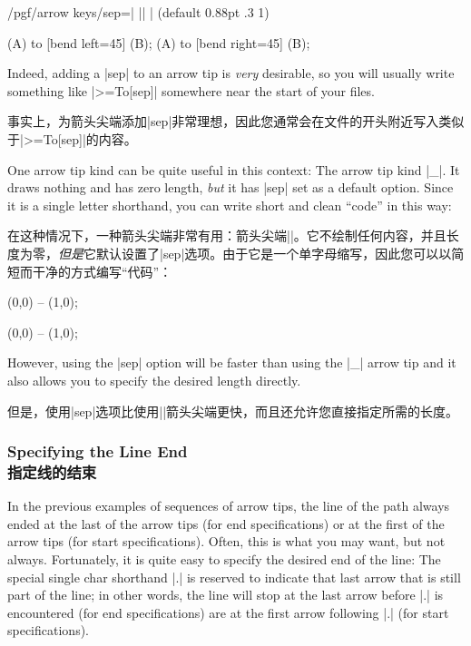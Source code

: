 \begin{key}{/pgf/arrow keys/sep=| || | (default 0.88pt .3 1)%
}
\begin{codeexample}[preamble={\usetikzlibrary{arrows.meta,positioning}}]
{  \draw [-{>>[sep=2pt]}] (A) to [bend left=45] (B);
  \draw [- >>          ] (A) to [bend right=45] (B);
}
\end{codeexample}
    Indeed, adding a |sep| to an arrow tip is \emph{very} desirable, so you
    will usually write something like |>={To[sep]}| somewhere near the start of
    your files.

    事实上，为箭头尖端添加|sep|非常理想，因此您通常会在文件的开头附近写入类似于|>={To[sep]}|的内容。

    One arrow tip kind can be quite useful in this context: The arrow tip kind
    |_|. It draws nothing and has zero length, \emph{but} it has |sep| set as a
    default option. Since it is a single letter shorthand, you can write short
    and clean ``code'' in this way:
    
    在这种情况下，一种箭头尖端非常有用：箭头尖端||。它不绘制任何内容，并且长度为零，\emph{但是}它默认设置了|sep|选项。由于它是一个单字母缩写，因此您可以以简短而干净的方式编写“代码”：
\begin{codeexample}[]
\tikz \draw [->_>] (0,0) -- (1,0);
\end{codeexample}
\begin{codeexample}[]
\tikz \draw [->__>] (0,0) -- (1,0);
\end{codeexample}
    However, using the |sep| option will be faster than using the |_| arrow tip
    and it also allows you to specify the desired length directly.

    但是，使用|sep|选项比使用||箭头尖端更快，而且还允许您直接指定所需的长度。
\end{key}


\subsubsection{Specifying the Line End\\指定线的结束}

In the previous examples of sequences of arrow tips, the line of the path
always ended at the last of the arrow tips (for end specifications) or at the
first of the arrow tips (for start specifications). Often, this is what you may
want, but not always. Fortunately, it is quite easy to specify the desired end
of the line: The special single char shorthand |.| is reserved to indicate that
last arrow that is still part of the line; in other words, the line will stop
at the last arrow before |.| is encountered (for end specifications) are at the
first arrow following |.| (for start specifications).

